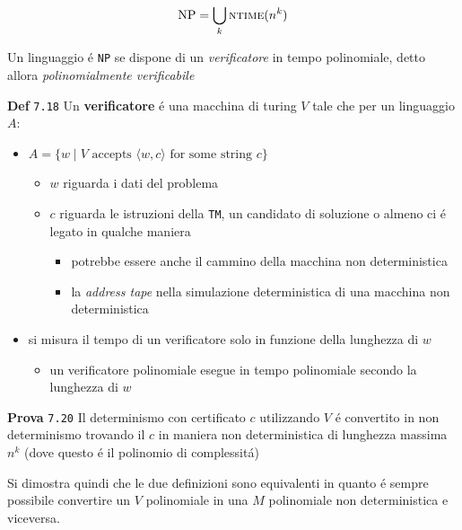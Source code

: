 \documentclass[11pt]{article}
\begin{document}
\[\text{NP} = \bigcup_k \textsc{ntime}(n^k)\]

Un linguaggio é \texttt{NP} se dispone di un \emph{verificatore} in tempo polinomiale, detto allora \emph{polinomialmente verificabile}

\textbf{Def} \texttt{7.18}
Un \textbf{verificatore} é una macchina di turing \(V\) tale che per un linguaggio \(A\):
\begin{itemize}
\item \(A = \{w \mid V \text{ accepts } \langle w,c \rangle \text{ for some string }c\}\)
\begin{itemize}
\item \(w\) riguarda i dati del problema
\item \(c\) riguarda le istruzioni della \texttt{TM}, un candidato di soluzione o almeno ci é legato in qualche maniera
\begin{itemize}
\item potrebbe essere anche il cammino della macchina non deterministica
\item la \emph{address tape} nella simulazione deterministica di una macchina non deterministica
\end{itemize}
\end{itemize}
\item si misura il tempo di un verificatore solo in funzione della lunghezza di \(w\)
\begin{itemize}
\item un verificatore polinomiale esegue in tempo polinomiale secondo la lunghezza di \(w\)
\end{itemize}
\end{itemize}

\textbf{Prova} \texttt{7.20}
Il determinismo con certificato \(c\) utilizzando \(V\) é convertito in non determinismo trovando il \(c\) in maniera non deterministica di lunghezza massima \(n^k\) (dove questo é il polinomio di complessitá)

Si dimostra quindi che le due definizioni sono equivalenti in quanto é sempre possibile convertire un \(V\) polinomiale in una \(M\) polinomiale non deterministica e viceversa.
\end{document}
